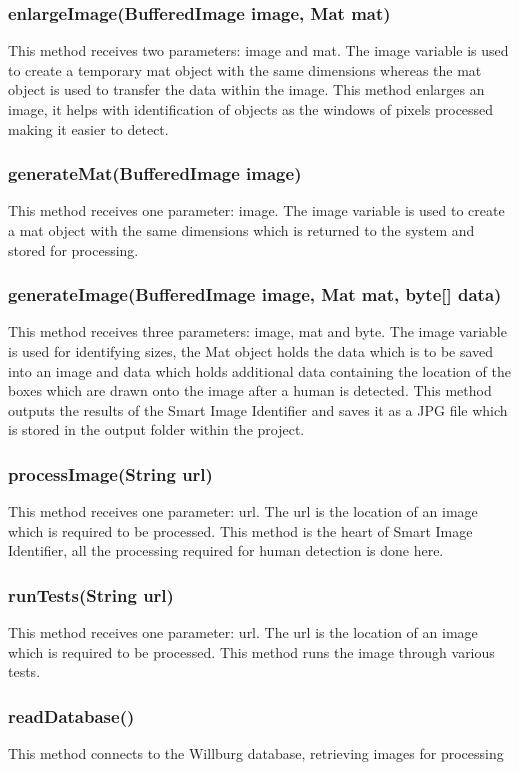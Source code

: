 \documentclass[a4paper,12pt]{report}
\begin{document}
\subsubsection{enlargeImage(BufferedImage image, Mat mat)}
This method receives two parameters: image and mat. The image variable is used to
create a temporary mat object with the same dimensions whereas the mat object is used
to transfer the data within the image.
This method enlarges an image, it helps with identification of objects as the windows of
pixels processed making it easier to detect.
\subsubsection{generateMat(BufferedImage image)}
This method receives one parameter: image. The image variable is used to create a mat
object with the same dimensions which is returned to the system and stored for
processing.
\subsubsection{generateImage(BufferedImage image, Mat mat, byte[] data)}
This method receives three parameters: image, mat and byte. The image variable is used
for identifying sizes, the Mat object holds the data which is to be saved into an image and
data which holds additional data containing the location of the boxes which are drawn
onto the image after a human is detected.
This method outputs the results of the Smart Image Identifier and saves it as a JPG file
which is stored in the output folder within the project.
\subsubsection{processImage(String url)}
This method receives one parameter: url. The url is the location of an image which is
required to be processed.
This method is the heart of Smart Image Identifier, all the processing required for human
detection is done here.
\subsubsection{runTests(String url)}
This method receives one parameter: url. The url is the location of an image which is required to be processed.
This method runs the image through various tests.

\subsubsection{readDatabase()}
This method connects to the Willburg database, retrieving images for processing
\end{document}
